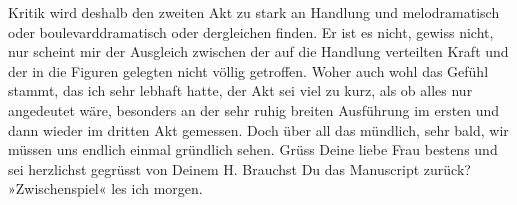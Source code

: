 \begin{ledgroupsized}[t]{13cm}
               Kritik wird deshalb den zweiten Akt zu stark an Handlung und melodramatisch oder
               boulevarddramatisch oder dergleichen finden. Er ist es nicht, gewiss nicht, nur
               scheint mir der Ausgleich zwischen der auf die Handlung verteilten Kraft und der in
               die Figuren gelegten nicht völlig getroffen. Woher auch wohl das Gefühl stammt, das
               ich sehr lebhaft hatte, der Akt sei viel zu kurz, als ob alles nur angedeutet wäre,
               besonders an der sehr ruhig breiten Ausführung im ersten und dann wieder im dritten
               Akt gemessen. Doch über all das mündlich, sehr bald, wir müssen uns endlich einmal
               gründlich sehen. Grüss Deine liebe Frau bestens und sei herzlichst gegrüsst von Deinem\pend
           \pstart \spacefill\mbox{H.}\pend{}\pstart
           \noindent{}Brauchst Du das Manuscript zurück? »Zwischenspiel« les ich morgen.\pend
           \endnumbering{}\end{ledgroupsized}  \newcommand{\dateiname}{L01548}\newcommand{\titel}{Hermann Bahr an Arthur Schnitzler, 17. 9. 1905}\newcommand{\editorInnen}{ Kurt Ifkovits,  Martin Anton Müller}
            \footnotesize
\begin{ledgroupsized}[t]{11.5cm}
\end{ledgroupsized}
         
      
